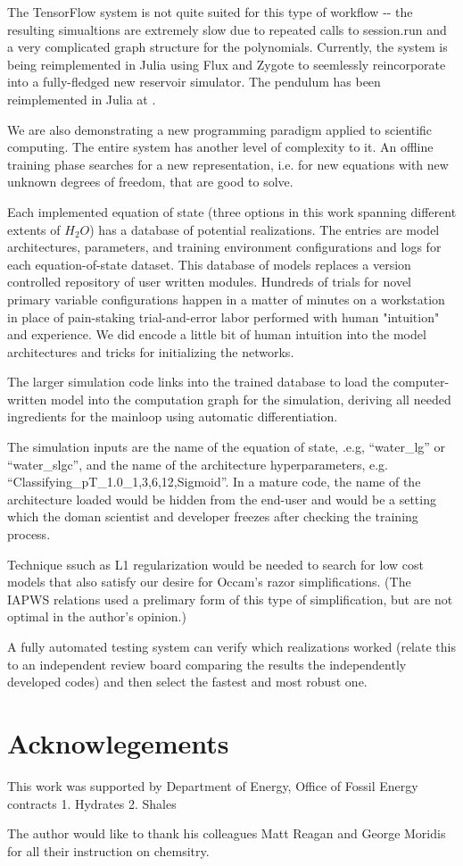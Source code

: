 \documentclass[]{article}
\begin{document}
The TensorFlow system is not quite suited for this type of workflow -\/-
the resulting simualtions are extremely slow due to repeated calls to
session.run and a very complicated graph structure for the polynomials.
Currently, the system is being reimplemented in Julia using Flux and
Zygote to seemlessly reincorporate into a fully-fledged new reservoir
simulator. The pendulum has been reimplemented in Julia at .

We are also demonstrating a new programming paradigm applied to
scientific computing. The entire system has another level of complexity
to it. An offline training phase searches for a new representation, i.e.
for new equations with new unknown degrees of freedom, that are good to
solve.

Each implemented equation of state (three options in this work spanning
different extents of \(H_2O\)) has a database of potential realizations.
The entries are model architectures, parameters, and training
environment configurations and logs for each equation-of-state dataset.
This database of models replaces a version controlled repository of user
written modules. Hundreds of trials for novel primary variable
configurations happen in a matter of minutes on a workstation in place
of pain-staking trial-and-error labor performed with human "intuition"
and experience. We did encode a little bit of human intuition into the
model architectures and tricks for initializing the networks.

The larger simulation code links into the trained database to load the
computer-written model into the computation graph for the simulation,
deriving all needed ingredients for the mainloop using automatic
differentiation.

The simulation inputs are the name of the equation of state, .e.g,
``water\_lg'' or ``water\_slgc'', and the name of the architecture
hyperparameters, e.g. ``Classifying\_pT\_1.0\_1,3,6,12,Sigmoid''.
In a mature code, the name of the architecture loaded would be hidden
from the end-user and would be a setting which the doman scientist and developer freezes
after checking the training process.

Technique ssuch as L1 regularization would be needed to search for low
cost models that also satisfy our desire for Occam's razor
simplifications. (The IAPWS relations used a prelimary form of this
type of simplification, but are not optimal in the author's opinion.)

A fully automated testing system can verify which realizations worked
(relate this to an independent review board comparing the results the
independently developed codes) and then select the fastest and most
robust one.

\section*{Acknowlegements}

This work was supported by Department of Energy, Office of Fossil
Energy contracts
1. Hydrates
2. Shales

The author would like to thank his colleagues Matt Reagan and George
Moridis for all their instruction on chemsitry. 


\end{document}
